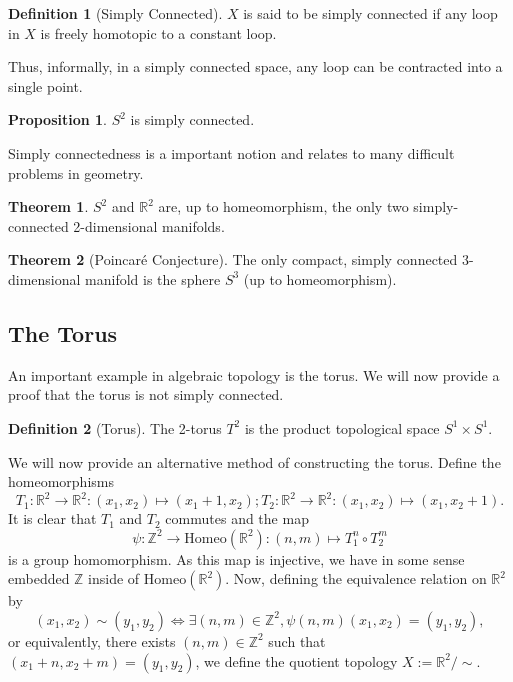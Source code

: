 \documentclass[]{article}
\theoremstyle{definition}
\newtheorem{theorem}{Theorem}
\theoremstyle{definition}
\newtheorem{definition}{Definition}[section]
\newtheorem{proposition}{Proposition}[section]
\begin{document}
\begin{definition}[Simply Connected]
  \(X\) is said to be simply connected if any loop in \(X\) is freely homotopic 
  to a constant loop. 
\end{definition}

Thus, informally, in a simply connected space, any loop can be contracted into 
a single point.

\begin{proposition}
  \(S^2\) is simply connected.
\end{proposition}

Simply connectedness is a important notion and relates to many difficult problems 
in geometry. 

\begin{theorem}
  \(S^2\) and \(\mathbb{R}^2\) are, up to homeomorphism, the only two simply-connected 
  2-dimensional manifolds.
\end{theorem}

\begin{theorem}[Poincaré Conjecture]
  The only compact, simply connected 3-dimensional manifold is the sphere \(S^3\) 
  (up to homeomorphism).
\end{theorem}

\subsection{The Torus}

An important example in algebraic topology is the torus. We will now provide a 
proof that the torus is not simply connected.

\begin{definition}[Torus]
  The 2-torus \(T^2\) is the product topological space \(S^1 \times S^1\).
\end{definition}

We will now provide an alternative method of constructing the torus.
Define the homeomorphisms
\[T_1 : \mathbb{R}^2 \to \mathbb{R}^2 : (x_1, x_2) \mapsto (x_1 + 1, x_2); 
  T_2 : \mathbb{R}^2 \to \mathbb{R}^2 : (x_1, x_2) \mapsto (x_1, x_2 + 1).\]
It is clear that \(T_1\) and \(T_2\) commutes and the map 
\[\psi : \mathbb{Z}^2 \to \text{Homeo}(\mathbb{R}^2) : (n, m) \mapsto T_1^n \circ T_2^m\]
is a group homomorphism. As this map is injective, we have in some sense embedded 
\(\mathbb{Z}\) inside of \(\text{Homeo}(\mathbb{R}^2)\). Now, defining the equivalence 
relation on \(\mathbb{R}^2\) by 
\[(x_1, x_2) \sim (y_1, y_2) \iff \exists (n, m) \in \mathbb{Z}^2, \psi(n, m)(x_1, x_2) = (y_1, y_2),\]
or equivalently, there exists \((n, m) \in \mathbb{Z}^2\) such that \((x_1 + n, x_2 + m) = (y_1, y_2)\), 
we define the quotient topology \(X := \mathbb{R}^2 / \sim\). 
\end{document}
